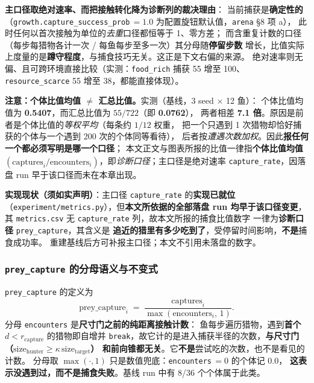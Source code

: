 \textbf{主口径取绝对速率、而把接触转化降为诊断列的裁决理由}：
当前捕获是\textbf{确定性的}（\texttt{growth.capture\_success\_prob}\,$=1.0$ 为配置旋钮默认值，\texttt{arena} \S8 项 a），
此时任何以首次接触为单位的\emph{去重}口径都恒等于 1、零方差；
而含重复计数的口径（每步每猎物各计一次 / 每鱼每步至多一次）其分母随\textbf{停留步数}
增长，比值实际上度量的是\textbf{蹲守程度}，与捕食技巧无关。这正是下文右偏的来源。
绝对速率则无偏、且可跨环境直接比较（实测：\texttt{food\_rich} 捕获 55 增至 100、
\texttt{resource\_scarce} 55 增至 38，都能直接体现）。

\textbf{注意：个体比值均值 $\ne$ 汇总比值。}实测（基线，3 seed $\times$ 12 鱼）：
个体比值均值为 \textbf{0.5407}，而汇总比值为 $55/722$（即 \textbf{0.0762}），
两者相差 \textbf{7.1 倍}。原因是前者是个体比值的\emph{等权平均}（每条约 $1/12$ 权重，
把一个只遇到 1 次猎物却恰好捕获的个体与一个遇到 200 次的个体同等看待），
后者按\emph{遭遇次数加权}。因此\textbf{报任何一个都必须写明是哪一个口径}；
本文正文与图表所报的比值一律指\textbf{个体比值均值} $\overline{(\text{captures}_i/\text{encounters}_i)}$，即\emph{诊断口径}；主口径是绝对速率 \texttt{capture\_rate}，因落盘 run 早于该口径而未在本章出现。

\textbf{实现现状（须如实声明）}：主口径 \texttt{capture\_rate} 的\textbf{实现已就位}
（\texttt{experiment/metrics.py}），但\textbf{本文所依据的全部落盘 run 均早于该口径变更}，
其 \texttt{metrics.csv} 无 \texttt{capture\_rate} 列，故本文所报的捕食比值数字
一律为\textbf{诊断口径} \texttt{prey\_capture}，其含义是
\textbf{追近的猎里有多少吃到了}，受停留时间影响，\textbf{不是}捕食成功率。
重建基线后方可补报主口径；本文不引用未落盘的数字。
\subsubsection{\texttt{prey\_capture} 的分母语义与不变式}

\texttt{prey\_capture} 的定义为
\begin{equation}\label{eq:prey-capture}
  \text{prey\_capture}_i \;=\; \frac{\text{captures}_i}{\max(\text{encounters}_i,\,1)} .
\end{equation}
分母 \texttt{encounters} 是\textbf{尺寸门之前的纯距离接触计数}：
鱼每步遍历猎物，遇到\textbf{首个} $d<r_{\text{capture}}$ 的猎物即自增并
\texttt{break}，故它计的是进入捕获半径的次数，\textbf{与尺寸门
（$\text{size}_{\text{hunter}}\ge\kappa\,\text{size}_{\text{target}}$）
和前向锥都无关}。它\textbf{不是}尝试吃的次数，也不是看见的计数。
分母取 $\max(\cdot,1)$ 只是数值兜底：\texttt{encounters}\,$=0$ 的个体记 $0.0$，
\textbf{这表示没遇到过，而不是捕食失败}。基线 run 中有 8/36 个个体属于此类。

